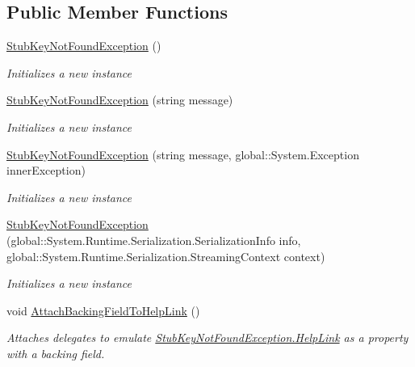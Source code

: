 \subsection*{Public Member Functions}
\begin{DoxyCompactItemize}
\item 
\hyperlink{class_system_1_1_collections_1_1_generic_1_1_fakes_1_1_stub_key_not_found_exception_ab46226b7a74732a9da882088339aae25}{Stub\-Key\-Not\-Found\-Exception} ()
\begin{DoxyCompactList}\small\item\em Initializes a new instance\end{DoxyCompactList}\item 
\hyperlink{class_system_1_1_collections_1_1_generic_1_1_fakes_1_1_stub_key_not_found_exception_a46cd5c085255e3d65f8f1fbab3638b5c}{Stub\-Key\-Not\-Found\-Exception} (string message)
\begin{DoxyCompactList}\small\item\em Initializes a new instance\end{DoxyCompactList}\item 
\hyperlink{class_system_1_1_collections_1_1_generic_1_1_fakes_1_1_stub_key_not_found_exception_ac4ff2b9eeaca51bdeb76bb51292c49ed}{Stub\-Key\-Not\-Found\-Exception} (string message, global\-::\-System.\-Exception inner\-Exception)
\begin{DoxyCompactList}\small\item\em Initializes a new instance\end{DoxyCompactList}\item 
\hyperlink{class_system_1_1_collections_1_1_generic_1_1_fakes_1_1_stub_key_not_found_exception_ac05013134389a8e29b50618fc68eca31}{Stub\-Key\-Not\-Found\-Exception} (global\-::\-System.\-Runtime.\-Serialization.\-Serialization\-Info info, global\-::\-System.\-Runtime.\-Serialization.\-Streaming\-Context context)
\begin{DoxyCompactList}\small\item\em Initializes a new instance\end{DoxyCompactList}\item 
void \hyperlink{class_system_1_1_collections_1_1_generic_1_1_fakes_1_1_stub_key_not_found_exception_a34934903360c9f7f2adc9bd06855169e}{Attach\-Backing\-Field\-To\-Help\-Link} ()
\begin{DoxyCompactList}\small\item\em Attaches delegates to emulate \hyperlink{class_system_1_1_collections_1_1_generic_1_1_fakes_1_1_stub_key_not_found_exception_a4ac0b1161ffa6c4ecb5361fca681bccb}{Stub\-Key\-Not\-Found\-Exception.\-Help\-Link} as a property with a backing field.\end{DoxyCompactList}\item 

\end{DoxyCompactItemize}
